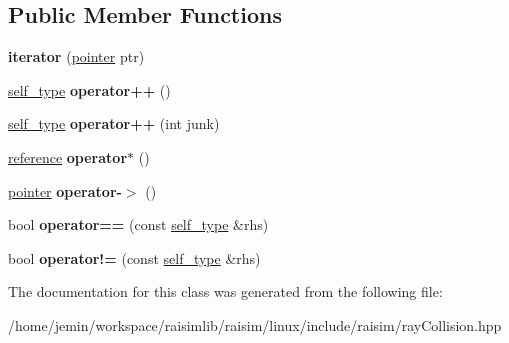 \subsection*{Public Member Functions}
\begin{DoxyCompactItemize}
\item 
\mbox{\label{classraisim_1_1RayCollisionList_1_1iterator_ab62285cd34ef6fd42b2b656ba595a54b}} 
{\bfseries iterator} (\hyperlink{classraisim_1_1RayCollisionItem}{pointer} ptr)
\item 
\mbox{\label{classraisim_1_1RayCollisionList_1_1iterator_a23502d9583de8aeda86f295cea0a867a}} 
\hyperlink{classraisim_1_1RayCollisionList_1_1iterator}{self\+\_\+type} {\bfseries operator++} ()
\item 
\mbox{\label{classraisim_1_1RayCollisionList_1_1iterator_ab2f07e7a3293c713008cb4ca39c4a85a}} 
\hyperlink{classraisim_1_1RayCollisionList_1_1iterator}{self\+\_\+type} {\bfseries operator++} (int junk)
\item 
\mbox{\label{classraisim_1_1RayCollisionList_1_1iterator_afb34869e1a7e094992831f2fdaf8e109}} 
\hyperlink{classraisim_1_1RayCollisionItem}{reference} {\bfseries operator$\ast$} ()
\item 
\mbox{\label{classraisim_1_1RayCollisionList_1_1iterator_a1d25f30503787393c3bd337499a8e78e}} 
\hyperlink{classraisim_1_1RayCollisionItem}{pointer} {\bfseries operator-\/$>$} ()
\item 
\mbox{\label{classraisim_1_1RayCollisionList_1_1iterator_a66ab1e7848ec91932f461c672367367b}} 
bool {\bfseries operator==} (const \hyperlink{classraisim_1_1RayCollisionList_1_1iterator}{self\+\_\+type} \&rhs)
\item 
\mbox{\label{classraisim_1_1RayCollisionList_1_1iterator_a1132527b4c763bc114aee7b8ee82a879}} 
bool {\bfseries operator!=} (const \hyperlink{classraisim_1_1RayCollisionList_1_1iterator}{self\+\_\+type} \&rhs)
\end{DoxyCompactItemize}


The documentation for this class was generated from the following file\+:\begin{DoxyCompactItemize}
\item 
/home/jemin/workspace/raisimlib/raisim/linux/include/raisim/ray\+Collision.\+hpp\end{DoxyCompactItemize}
